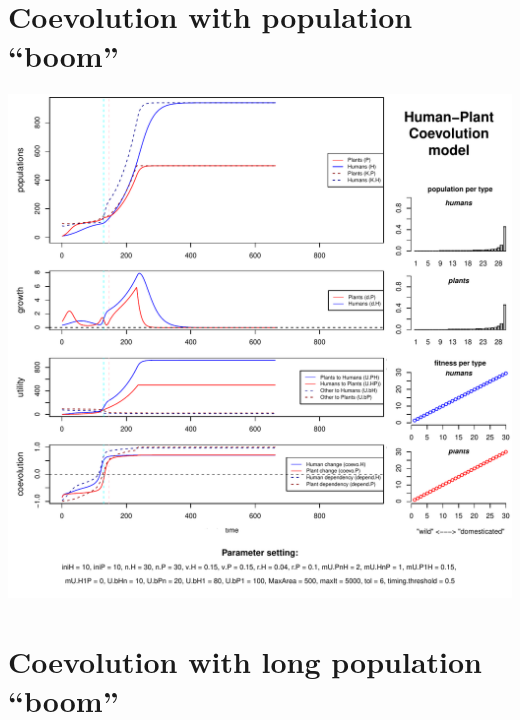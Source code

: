 \documentclass[]{book}
\begin{document}
\newpage

\hypertarget{coevolution-with-population-boom}{%
\section{Coevolution with population ``boom''}\label{coevolution-with-population-boom}}

\includegraphics{hpcModel-exploration_files/figure-latex/1_run.coevo.boom-plot-1.pdf}

\newpage

\hypertarget{coevolution-with-long-population-boom}{%
\section{Coevolution with long population ``boom''}\label{coevolution-with-long-population-boom}}
\end{document}
